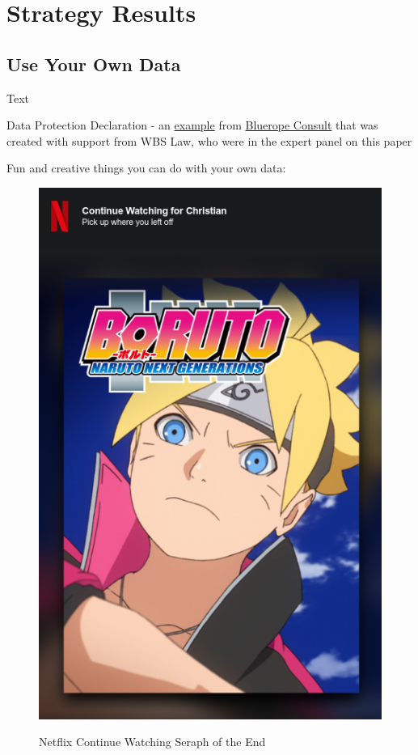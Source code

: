 %
%

\pagebreak
\section{Strategy Results}

\onehalfspacing

\subsection{Use Your Own Data}

Text

Data Protection Declaration - an \href{https://blueropeconsultonline.de/datenschutz/}{example} from \href{https://blueropeconsultonline.de/}{Bluerope Consult} that was created with support from WBS Law, who were in the expert panel on this paper

Fun and creative things you can do with your own data:

\begin{figure}[H]
\centering
\caption {Netflix Continue Watching Seraph of the End}
\includegraphics[scale=0.6]{images/continue-boruto.png}
\label{fig:seraph}
\end{figure}


